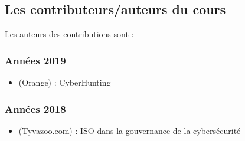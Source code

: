 
\subsection{Les contributeurs/auteurs du cours}

Les auteurs des contributions sont :

\subsubsection{Années 2019}

\begin{itemize}
  \item {} (Orange) : CyberHunting
\end{itemize}


\subsubsection{Années 2018}

\begin{itemize}
  \item {} (Tyvazoo.com) : ISO dans la gouvernance de la cybersécurité
\end{itemize}

